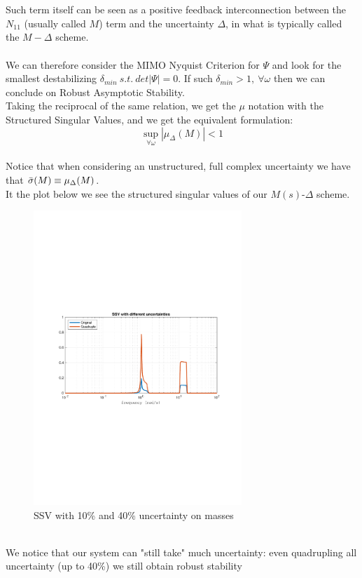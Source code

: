 \documentclass[a4paper, 12pt]{article}
\def\FigureEleven{\centering\includegraphics[width=0.7\textwidth]{Figures/fig11.pdf}}
\begin{document}
\\\\
Such term itself can be seen as a positive feedback interconnection between the $N_{11}$ (usually called $M$) term and the uncertainty $\Delta$, in what is typically called the $M-\Delta$ scheme.\\
\\We can therefore consider the MIMO Nyquist Criterion for $\Psi$ and look for the smallest destabilizing $\delta_{min}\ s.t.\ det|\Psi| = 0$. If such  $\delta_{min} > 1,\ \forall \omega$ then we can conclude on Robust Asymptotic Stability.
\\ Taking the reciprocal of the same relation, we get the $\mu$ notation with the Structured Singular Values, and we get the equivalent formulation:
\begin{equation*}
\sup_{\forall \omega} \left| \mu_{\Delta} (M) \right| < 1
\end{equation*}
\\
Notice that when considering an unstructured, full complex uncertainty we have that $\Bar{\sigma}(M) \equiv \mu_{\Delta} (M)$.
\\
It the plot below we see the structured singular values of our $M(s)$-$\Delta$ scheme.
\begin{figure}[h!]
    \FigureEleven
    \caption{SSV with 10\% and 40\% uncertainty on masses}
    \label{fig:fig11}
\end{figure}
\\We notice that our system can "still take" much uncertainty: even quadrupling all uncertainty (up to 40\%) we still obtain robust stability
\clearpage
\end{document}
